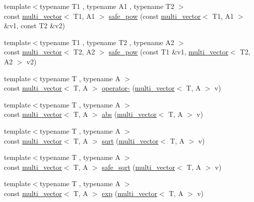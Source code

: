 \begin{DoxyCompactItemize}
\item 
{\footnotesize template$<$typename T1 , typename A1 , typename T2 $>$ }\\const \hyperlink{classIceBRG_1_1multi__vector}{multi\-\_\-vector}$<$ T1, A1 $>$ \hyperlink{namespaceIceBRG_adf05dc7cf51f011bea3a3c29d54d44e0}{safe\-\_\-pow} (const \hyperlink{classIceBRG_1_1multi__vector}{multi\-\_\-vector}$<$ T1, A1 $>$ \&v1, const T2 \&v2)
\item 
{\footnotesize template$<$typename T1 , typename T2 , typename A2 $>$ }\\const \hyperlink{classIceBRG_1_1multi__vector}{multi\-\_\-vector}$<$ T2, A2 $>$ \hyperlink{namespaceIceBRG_a6cf85db10c2fba10bd89f305ee5ac52f}{safe\-\_\-pow} (const T1 \&v1, \hyperlink{classIceBRG_1_1multi__vector}{multi\-\_\-vector}$<$ T2, A2 $>$ v2)
\item 
{\footnotesize template$<$typename T , typename A $>$ }\\const \hyperlink{classIceBRG_1_1multi__vector}{multi\-\_\-vector}$<$ T, A $>$ \hyperlink{namespaceIceBRG_af5a45a1ae5b6ab5ebae83d9f649318a5}{operator-\/} (\hyperlink{classIceBRG_1_1multi__vector}{multi\-\_\-vector}$<$ T, A $>$ v)
\item 
{\footnotesize template$<$typename T , typename A $>$ }\\const \hyperlink{classIceBRG_1_1multi__vector}{multi\-\_\-vector}$<$ T, A $>$ \hyperlink{namespaceIceBRG_ad6f65f5bba2c8b96b6b33f93cfa3cd7f}{abs} (\hyperlink{classIceBRG_1_1multi__vector}{multi\-\_\-vector}$<$ T, A $>$ v)
\item 
{\footnotesize template$<$typename T , typename A $>$ }\\const \hyperlink{classIceBRG_1_1multi__vector}{multi\-\_\-vector}$<$ T, A $>$ \hyperlink{namespaceIceBRG_ad78a65d06e8bdc03534b89fd3ec01789}{sqrt} (\hyperlink{classIceBRG_1_1multi__vector}{multi\-\_\-vector}$<$ T, A $>$ v)
\item 
{\footnotesize template$<$typename T , typename A $>$ }\\const \hyperlink{classIceBRG_1_1multi__vector}{multi\-\_\-vector}$<$ T, A $>$ \hyperlink{namespaceIceBRG_a4d1466ea7750a9f6de43a79e4c8d23d1}{safe\-\_\-sqrt} (\hyperlink{classIceBRG_1_1multi__vector}{multi\-\_\-vector}$<$ T, A $>$ v)
\item 
{\footnotesize template$<$typename T , typename A $>$ }\\const \hyperlink{classIceBRG_1_1multi__vector}{multi\-\_\-vector}$<$ T, A $>$ \hyperlink{namespaceIceBRG_ac32d08c445a60fcadf434ace48406d94}{exp} (\hyperlink{classIceBRG_1_1multi__vector}{multi\-\_\-vector}$<$ T, A $>$ v)

\end{DoxyCompactItemize}
